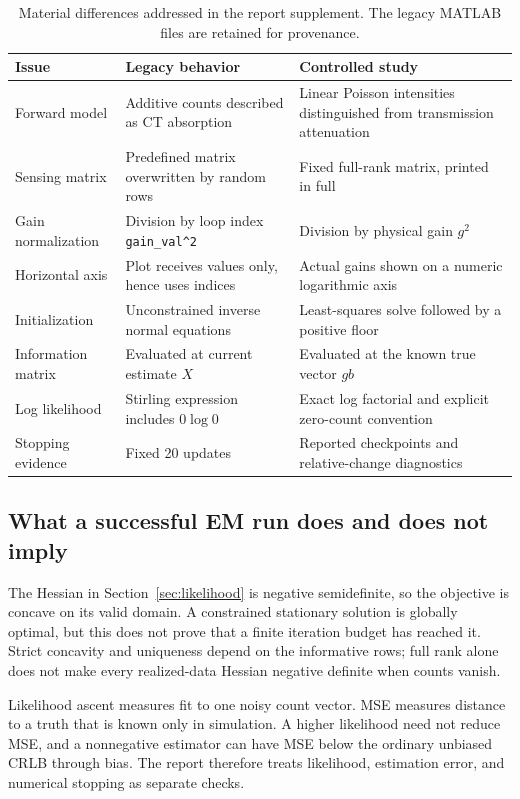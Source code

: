 \documentclass[11pt,a4paper]{article}
\begin{document}
\begin{table}[H]\small
\caption{Material differences addressed in the report supplement. The legacy MATLAB files are retained for provenance.}
\begin{tabularx}{\linewidth}{@{}>{\raggedright\arraybackslash}p{.22\linewidth}>{\raggedright\arraybackslash}X>{\raggedright\arraybackslash}X@{}}\toprule
Issue & Legacy behavior & Controlled study\\\midrule
Forward model & Additive counts described as CT absorption & Linear Poisson intensities distinguished from transmission attenuation\\
Sensing matrix & Predefined matrix overwritten by random rows & Fixed full-rank matrix, printed in full\\
Gain normalization & Division by loop index \texttt{gain\_val\^{}2} & Division by physical gain $g^2$\\
Horizontal axis & Plot receives values only, hence uses indices & Actual gains shown on a numeric logarithmic axis\\
Initialization & Unconstrained inverse normal equations & Least-squares solve followed by a positive floor\\
Information matrix & Evaluated at current estimate $X$ & Evaluated at the known true vector $gb$\\
Log likelihood & Stirling expression includes $0\log0$ & Exact log factorial and explicit zero-count convention\\
Stopping evidence & Fixed 20 updates & Reported checkpoints and relative-change diagnostics\\\bottomrule
\end{tabularx}
\end{table}

\subsection*{What a successful EM run does and does not imply}
The Hessian in Section~\ref{sec:likelihood} is negative semidefinite, so the objective is concave on its valid domain. A constrained stationary solution is globally optimal, but this does not prove that a finite iteration budget has reached it. Strict concavity and uniqueness depend on the informative rows; full rank alone does not make every realized-data Hessian negative definite when counts vanish.

Likelihood ascent measures fit to one noisy count vector. MSE measures distance to a truth that is known only in simulation. A higher likelihood need not reduce MSE, and a nonnegative estimator can have MSE below the ordinary unbiased CRLB through bias. The report therefore treats likelihood, estimation error, and numerical stopping as separate checks.
\end{document}
